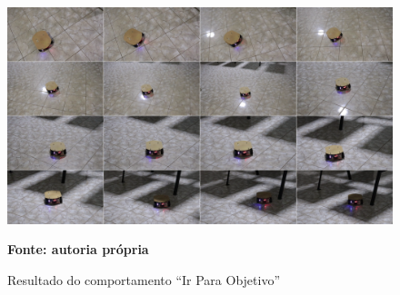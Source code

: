 \begin{figure}[!ht]
\centering
\caption{Resultado do comportamento ``Ir Para Objetivo''}
\label{fig:resultadoImplementadoIPO}
		\centering
		\includegraphics[clip, 
scale=0.29]{Figuras/ComportamentoIPOCompactado}%

	\textbf{Fonte: autoria própria}
\end{figure}